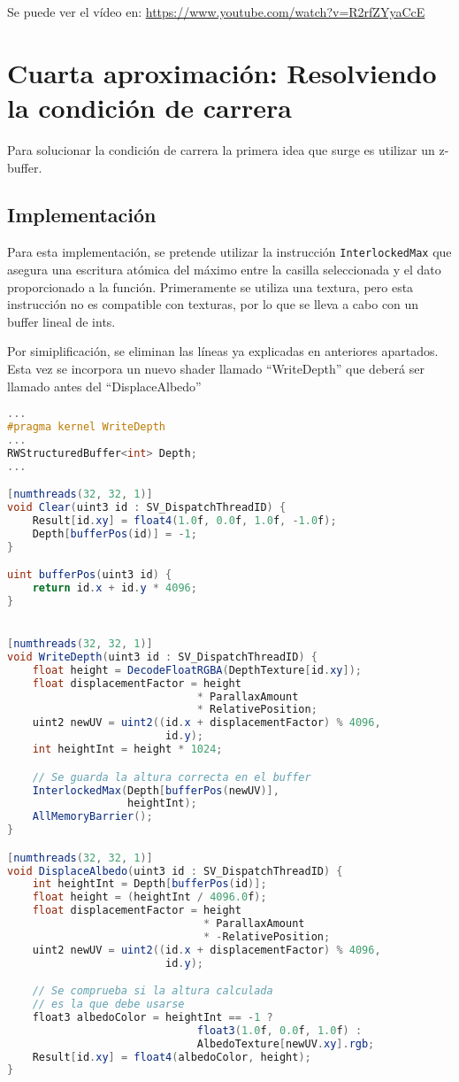 Se puede ver el vídeo en: \url{https://www.youtube.com/watch?v=R2rfZYyaCcE}

\section{Cuarta aproximación: Resolviendo la condición de carrera}
Para solucionar la condición de carrera la primera idea que surge es utilizar un z-buffer.

\subsection{Implementación}
Para esta implementación, se pretende utilizar la instrucción \texttt{InterlockedMax} que asegura una escritura atómica del máximo entre la casilla seleccionada y el dato proporcionado a la función. Primeramente se utiliza una textura, pero esta instrucción no es compatible con texturas, por lo que se lleva a cabo con un buffer lineal de ints.

Por simiplificación, se eliminan las líneas ya explicadas en anteriores apartados. Esta vez se incorpora un nuevo shader llamado ``WriteDepth'' que deberá ser llamado antes del ``DisplaceAlbedo''

\begin{lstlisting}[language=glsl]
...
#pragma kernel WriteDepth
...
RWStructuredBuffer<int> Depth;
...

[numthreads(32, 32, 1)]
void Clear(uint3 id : SV_DispatchThreadID) {
    Result[id.xy] = float4(1.0f, 0.0f, 1.0f, -1.0f);
    Depth[bufferPos(id)] = -1;
}

uint bufferPos(uint3 id) {
    return id.x + id.y * 4096;
}


[numthreads(32, 32, 1)]
void WriteDepth(uint3 id : SV_DispatchThreadID) {
    float height = DecodeFloatRGBA(DepthTexture[id.xy]);
    float displacementFactor = height 
                              * ParallaxAmount 
                              * RelativePosition;
    uint2 newUV = uint2((id.x + displacementFactor) % 4096, 
                         id.y);
    int heightInt = height * 1024;

    // Se guarda la altura correcta en el buffer
    InterlockedMax(Depth[bufferPos(newUV)], 
                   heightInt);
    AllMemoryBarrier();
}

[numthreads(32, 32, 1)]
void DisplaceAlbedo(uint3 id : SV_DispatchThreadID) {
    int heightInt = Depth[bufferPos(id)];
    float height = (heightInt / 4096.0f);
    float displacementFactor = height 
                               * ParallaxAmount 
                               * -RelativePosition;
    uint2 newUV = uint2((id.x + displacementFactor) % 4096, 
                         id.y);

    // Se comprueba si la altura calculada
    // es la que debe usarse
    float3 albedoColor = heightInt == -1 ? 
                              float3(1.0f, 0.0f, 1.0f) : 
                              AlbedoTexture[newUV.xy].rgb;
    Result[id.xy] = float4(albedoColor, height);
}
\end{lstlisting}

